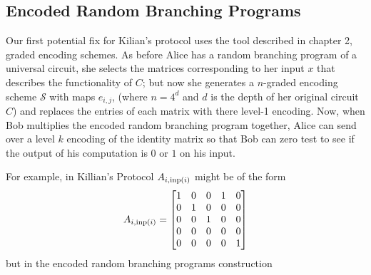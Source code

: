 \documentclass[12pt,twoside]{reedthesis}
\begin{document}
    \subsection{Encoded Random Branching Programs}
    
    \par Our first potential fix for Kilian's protocol uses the tool described in chapter 2, graded encoding schemes. As before Alice has a random branching program of a universal circuit, she selects the matrices corresponding to her input $x$ that describes the functionality of $C$; but now she generates a $n$-graded encoding scheme $\mathcal{S}$ with maps $e_{i,j}$, (where $n= 4^d$ and $d$ is the depth of her original circuit $C$) and replaces the entries of each matrix with there level-1 encoding. Now, when Bob multiplies the encoded random branching program together, Alice can send over a level $k$ encoding of the identity matrix so that Bob can zero test to see if the output of his computation is $0$ or $1$ on his input. 
    \par For example, in Killian's Protocol $A_{i,\text{inp}(i)}$ might be of the form
    $$ A_{i,\text{inp}(i)} = 
    \begin{bmatrix}
    1 &0 &0 &1 &0\\
    0 &1 &0 &0 &0\\
    0 &0 &1 &0 &0\\
    0 &0 &0 &0 &0\\
    0 &0 &0 &0 &1\\
    \end{bmatrix}
    $$
    but in the encoded random branching programs construction
    \newcommand{\e}[1]{\leftarrow S_1^{#1}}
    
\end{document}
